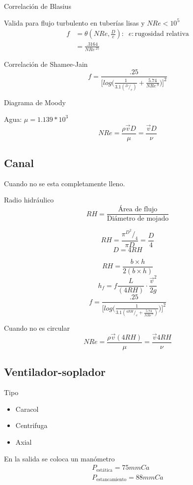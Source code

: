 Correlación de Blasius 

Valida para flujo turbulento en tuberías lisas y \( NRe <  10^{5} \) \\
\[
    \begin{split}
        f & = \theta(NRe, \frac{ D }{ e }): \;\; e: \text{rugosidad relativa} \\
        & = \frac{ .3164 }{ NRe^{.25} }
    \end{split}
\]

Correlación de Shamee-Jain
\[
    f = \frac{ .25 }{ \Big[ log \Big( \frac{ 1 }{ 3.1 ( {}^{D}/_{e} ) } + \frac{ 5.74 }{ NRe^{.9} } \Big) \Big]^{ 2 } } 
\]

Diagrama de Moody

Agua: \( \mu = 1.139 * 10^{3} \)
\[
    NRe = \frac{ \rho \Vec{v} D }{ \mu } = \frac{ \Vec{v} D }{ \nu }
\]

\subsection{Canal}
Cuando no se esta completamente lleno.

Radio hidráulico
\[
    RH = \frac{ \text{Área de flujo} }{ \text{Diámetro de mojado} }
\]


\[
    RH = \frac{ \pi {}^{ D^{2} }/_{ 4 } }{ \pi D } = \frac{ D }{ 4 }
\]
\[
    D = 4 RH
\]

\[
    RH = \frac{ b \times h }{ 2(b \times h) }
\]
\[
    h_{f} = f \frac{ L }{ (4 RH) } \cdot \frac{ \Vec{v}^{2} }{ 2g }
\]
\[
    f = \frac{ .25 }{ \Big[ log \Big( \frac{ 1 }{ 3.1 ( {}^{4RH}/_{e} + \frac{ 5.74 }{ NRe^{.9} } ) } \Big) \Big]^{2} }
\]

Cuando no es circular
\[
    NRe = \frac{ \rho  \Vec{v} (4RH) }{ \mu } = \frac{ \Vec{v} 4RH }{ \nu }
\]

\subsection{Ventilador-soplador}
Tipo
\begin{itemize}
    \item Caracol
    \item Centrifuga
    \item Axial
\end{itemize}

En la salida se coloca un manómetro
\[
    \begin{split}
        P_{\text{estática}} = 75 mmCa \\
        P_{\text{estancamiento}} = 88 mmCa
    \end{split}
\]

